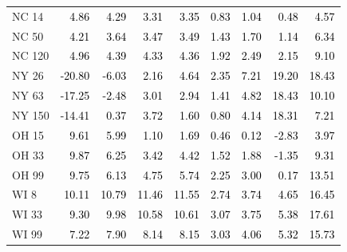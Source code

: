 \begin{tabular}{lrrrrrrrr}
NC 14 & \textcolor{black}{ 4.86 } & \textcolor{black}{ 4.29 } & \textcolor{black}{ 3.31 } & \textcolor{black}{ 3.35 } & \textcolor{black}{ 0.83 } & \textcolor{black}{ 1.04 } & \textcolor{black}{ 0.48 } & \textcolor{black}{ 4.57 } \\
NC 50 & \textcolor{black}{ 4.21 } & \textcolor{black}{ 3.64 } & \textcolor{black}{ 3.47 } & \textcolor{black}{ 3.49 } & \textcolor{black}{ 1.43 } & \textcolor{black}{ 1.70 } & \textcolor{black}{ 1.14 } & \textcolor{black}{ 6.34 } \\
NC 120 & \textcolor{black}{ 4.96 } & \textcolor{black}{ 4.39 } & \textcolor{black}{ 4.33 } & \textcolor{black}{ 4.36 } & \textcolor{black}{ 1.92 } & \textcolor{black}{ 2.49 } & \textcolor{black}{ 2.15 } & \textcolor{black}{ 9.10 } \\
NY 26 & \textcolor{black}{ -20.80 } & \textcolor{black}{ -6.03 } & \textcolor{black}{ 2.16 } & \textcolor{black}{ 4.64 } & \textcolor{black}{ 2.35 } & \textcolor{black}{ 7.21 } & \textcolor{black}{ 19.20 } & \textcolor{black}{ 18.43 } \\
NY 63 & \textcolor{black}{ -17.25 } & \textcolor{black}{ -2.48 } & \textcolor{black}{ 3.01 } & \textcolor{black}{ 2.94 } & \textcolor{black}{ 1.41 } & \textcolor{black}{ 4.82 } & \textcolor{black}{ 18.43 } & \textcolor{black}{ 10.10 } \\
NY 150 & \textcolor{black}{ -14.41 } & \textcolor{black}{ 0.37 } & \textcolor{black}{ 3.72 } & \textcolor{black}{ 1.60 } & \textcolor{black}{ 0.80 } & \textcolor{black}{ 4.14 } & \textcolor{black}{ 18.31 } & \textcolor{black}{ 7.21 } \\
OH 15 & \textcolor{black}{ 9.61 } & \textcolor{black}{ 5.99 } & \textcolor{black}{ 1.10 } & \textcolor{black}{ 1.69 } & \textcolor{black}{ 0.46 } & \textcolor{black}{ 0.12 } & \textcolor{black}{ -2.83 } & \textcolor{black}{ 3.97 } \\
OH 33 & \textcolor{black}{ 9.87 } & \textcolor{black}{ 6.25 } & \textcolor{black}{ 3.42 } & \textcolor{black}{ 4.42 } & \textcolor{black}{ 1.52 } & \textcolor{black}{ 1.88 } & \textcolor{black}{ -1.35 } & \textcolor{black}{ 9.31 } \\
OH 99 & \textcolor{black}{ 9.75 } & \textcolor{black}{ 6.13 } & \textcolor{black}{ 4.75 } & \textcolor{black}{ 5.74 } & \textcolor{black}{ 2.25 } & \textcolor{black}{ 3.00 } & \textcolor{black}{ 0.17 } & \textcolor{black}{ 13.51 } \\
WI 8 & \textcolor{black}{ 10.11 } & \textcolor{black}{ 10.79 } & \textcolor{black}{ 11.46 } & \textcolor{black}{ 11.55 } & \textcolor{black}{ 2.74 } & \textcolor{black}{ 3.74 } & \textcolor{black}{ 4.65 } & \textcolor{black}{ 16.45 } \\
WI 33 & \textcolor{black}{ 9.30 } & \textcolor{black}{ 9.98 } & \textcolor{black}{ 10.58 } & \textcolor{black}{ 10.61 } & \textcolor{black}{ 3.07 } & \textcolor{black}{ 3.75 } & \textcolor{black}{ 5.38 } & \textcolor{black}{ 17.61 } \\
WI 99 & \textcolor{black}{ 7.22 } & \textcolor{black}{ 7.90 } & \textcolor{black}{ 8.14 } & \textcolor{black}{ 8.15 } & \textcolor{black}{ 3.03 } & \textcolor{black}{ 4.06 } & \textcolor{black}{ 5.32 } & \textcolor{black}{ 15.73 } \\
\bottomrule
\end{tabular}
